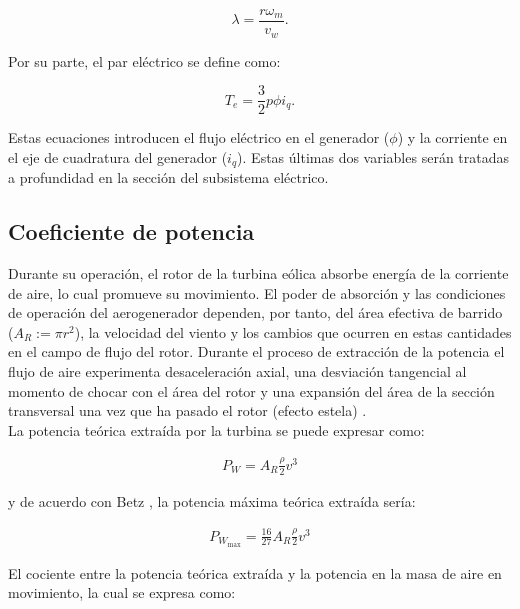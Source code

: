 \begin{equation}
    \lambda = \frac{r\omega_m}{v_w}.
    \label{eq:lambda}
\end{equation}

Por su parte, el par eléctrico se define como:

\begin{equation}
    T_e = \frac{3}{2}p\phi i_q.
    \label{eq:electrical_torque}
\end{equation}

Estas ecuaciones introducen el flujo eléctrico en el generador ($\phi$) y la corriente en el eje de 
cuadratura del generador ($i_q$). Estas últimas dos variables serán tratadas
a profundidad en la sección del subsistema eléctrico.


\subsection{Coeficiente de potencia}\label{sec:coef_potencia}

Durante su operación, el rotor de la turbina eólica absorbe energía de la corriente de aire, 
lo cual promueve su movimiento. El poder de absorción y las condiciones de operación del aerogenerador dependen, por tanto, 
del área efectiva de barrido ($A_R := \pi r^2$), la velocidad del viento y los cambios que ocurren en estas 
cantidades en el campo de flujo del rotor. Durante el proceso de extracción de la potencia el flujo de aire experimenta
desaceleración axial, una desviación tangencial al momento de chocar con el área del rotor y una 
expansión del área de la sección transversal una vez que ha pasado el rotor (efecto estela) \cite{heier2014}.
\\

La potencia teórica extraída por la turbina se puede expresar como:

\begin{align}
    P_W = A_R\frac{\rho}{2}v^3
    \label{eq:theoretical_power}
\end{align}

y de acuerdo con Betz \cite{betz1926}, la potencia máxima teórica extraída sería:

\begin{align}
    P_{W_{\text{max}}} = \frac{16}{27}A_R\frac{\rho}{2}v^3 
    \label{eq:max_theoretical_power}
\end{align}

El cociente entre la potencia teórica extraída y la potencia en la masa de aire en movimiento, la cual se expresa como:

